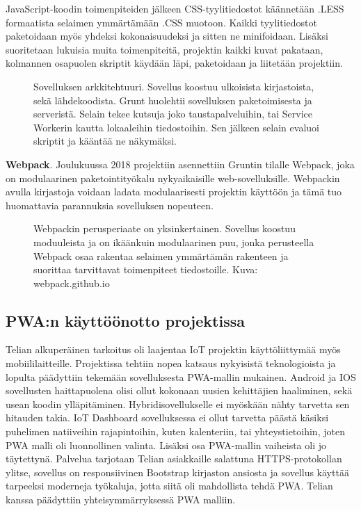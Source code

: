 \documentclass{tktltiki}
\begin{document}
JavaScript-koodin toimenpiteiden jälkeen CSS-tyylitiedostot käännetään .LESS formaatista selaimen ymmärtämään .CSS muotoon. Kaikki tyylitiedostot paketoidaan myös yhdeksi kokonaisuudeksi ja sitten ne minifoidaan. Lisäksi suoritetaan lukuisia muita toimenpiteitä, projektin kaikki kuvat pakataan, kolmannen osapuolen skriptit käydään läpi, paketoidaan ja liitetään projektiin.

\begin{figure}[h]
\begin{center}
\caption{Sovelluksen arkkitehtuuri. Sovellus koostuu ulkoisista kirjastoista, sekä lähdekoodista. Grunt huolehtii sovelluksen paketoimisesta ja serveristä. Selain tekee kutsuja joko taustapalveluihin, tai Service Workerin kautta lokaaleihin tiedostoihin. Sen jälkeen selain evaluoi skriptit ja kääntää ne näkymäksi.}
\label{angulararkkitehtuuri}
\end{center}
\end{figure}

\textbf{Webpack}. Joulukuussa 2018 projektiin asennettiin Gruntin tilalle Webpack, joka on modulaarinen paketointityökalu nykyaikaisille web-sovelluksille. Webpackin avulla kirjastoja voidaan ladata modulaarisesti projektin käyttöön ja tämä tuo huomattavia parannuksia sovelluksen nopeuteen. 

\begin{figure}[h]
\begin{center}
\caption{Webpackin perusperiaate on yksinkertainen. Sovellus koostuu moduuleista ja on ikäänkuin modulaarinen puu, jonka perusteella Webpack osaa rakentaa selaimen ymmärtämän rakenteen ja suorittaa tarvittavat toimenpiteet tiedostoille. Kuva: webpack.github.io}
\label{whatiswebpack}
\end{center}
\end{figure}



\subsection{PWA:n käyttöönotto projektissa}

Telian alkuperäinen tarkoitus oli laajentaa IoT projektin käyttöliittymää myös mobiililaitteille. Projektissa tehtiin nopea katsaus nykyisistä teknologioista ja lopulta päädyttiin tekemään sovelluksesta PWA-mallin mukainen. Android ja IOS sovellusten haittapuolena olisi ollut kokonaan uusien kehittäjien haaliminen, sekä usean koodin ylläpitäminen. Hybridisovellukselle ei myöskään nähty tarvetta sen hitauden takia. IoT Dashboard sovelluksessa ei ollut tarvetta päästä käsiksi puhelimen natiiveihin rajapintoihin, kuten kalenteriin, tai yhteystietoihin, joten PWA malli oli luonnollinen valinta. Lisäksi osa PWA-mallin vaiheista oli jo täytettynä. Palvelua tarjotaan Telian asiakkaille salattuna HTTPS-protokollan ylitse, sovellus on responsiivinen Bootstrap kirjaston ansiosta ja sovellus käyttää tarpeeksi moderneja työkaluja, jotta siitä oli mahdollista tehdä PWA. Telian kanssa päädyttiin yhteisymmärryksessä PWA malliin. 
\end{document}
